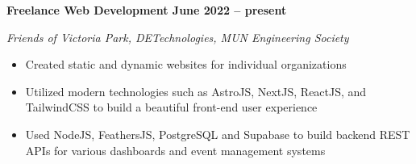 \vspace{0.1cm}
\textbf{Freelance Web Development \hfill June 2022 -- present} \par
\textit{Friends of Victoria Park, DETechnologies, MUN Engineering Society} \par
\begin{itemize}
    \item Created static and dynamic websites for individual organizations
    \item Utilized modern technologies such as AstroJS, NextJS, ReactJS, and TailwindCSS to build a beautiful front-end user experience
    \item Used NodeJS, FeathersJS, PostgreSQL and Supabase to build backend REST APIs for various dashboards and event management systems
\end{itemize} \par